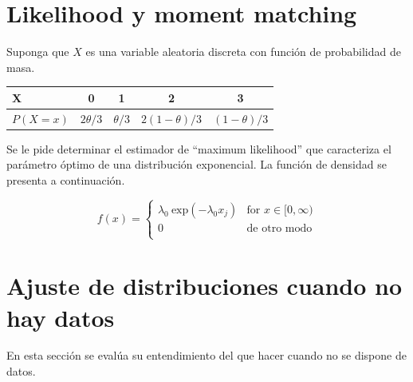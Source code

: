 \documentclass[11pt]{exam}
\begin{document}
\begin{questions}
\section*{Likelihood y moment matching}
\question Suponga que $X$ es una variable aleatoria discreta con funci\'on de probabilidad de masa.

\begin{table}[!htbp]
\centering
\begin{tabular}{lcccc}
\toprule
X&0&1&2&3\\
\midrule
$P(X=x)$ & $2\theta/3$ & $\theta/3$& $2(1-\theta)/3$ & $(1-\theta)/3$\\
\bottomrule
\end{tabular}
\end{table}


\question Se le pide determinar el estimador de ``maximum likelihood'' que caracteriza el par\'ametro \'optimo de una distribuci\'on exponencial. La funci\'on de densidad se presenta a continuaci\'on.

\[f(x)=
\begin{cases}
\lambda_0 ~\text{exp}(-\lambda_0x_j)&\text{for $x\in[0,\infty)$}\\
0&\text{de otro modo}\\
\end{cases}
\]

\section*{Ajuste de distribuciones cuando no hay datos}
\question En esta secci\'on se eval\'ua su entendimiento del que hacer cuando no se dispone de datos.
\begin{parts}

\end{parts}
\end{questions}
\end{document}
